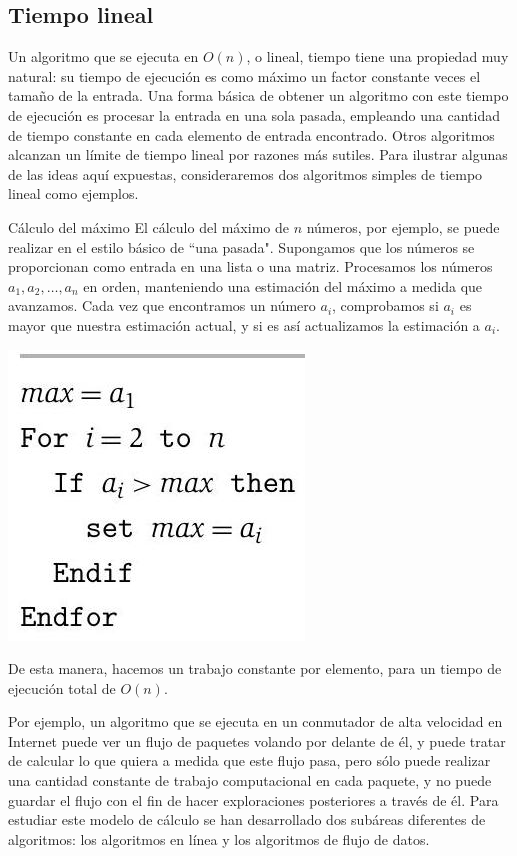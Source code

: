 \documentclass[a4paper, 12pt]{book}
\theoremstyle{dotless}
\begin{document}
\subsection*{Tiempo lineal}
Un algoritmo que se ejecuta en $O(n)$, o lineal, tiempo tiene una propiedad muy natural: su tiempo de ejecución es como máximo un factor constante veces el tamaño de la entrada. Una forma básica de obtener un algoritmo con este tiempo de ejecución es procesar la entrada en una sola pasada, empleando una cantidad de tiempo constante en cada elemento de entrada encontrado. Otros algoritmos alcanzan un límite de tiempo lineal por razones más sutiles. Para ilustrar algunas de las ideas aquí expuestas, consideraremos dos algoritmos simples de tiempo lineal como ejemplos.

Cálculo del máximo El cálculo del máximo de $n$ números, por ejemplo, se puede realizar en el estilo básico de ``una pasada". Supongamos que los números se proporcionan como entrada en una lista o una matriz. Procesamos los números $a_{1}, a_{2}, \ldots, a_{n}$ en orden, manteniendo una estimación del máximo a medida que avanzamos. Cada vez que encontramos un número $a_{i}$, comprobamos si $a_{i}$ es mayor que nuestra estimación actual, y si es así actualizamos la estimación a $a_{i}$.

\includegraphics[scale=0.3]{./Imagenes-Seccion2/2023_08_07_379b6f7f3185549667e3g-02}

De esta manera, hacemos un trabajo constante por elemento, para un tiempo de ejecución total de $O(n)$.

Por ejemplo, un algoritmo que se ejecuta en un conmutador de alta velocidad en Internet puede ver un flujo de paquetes volando por delante de él, y puede tratar de calcular lo que quiera a medida que este flujo pasa, pero sólo puede realizar una cantidad constante de trabajo computacional en cada paquete, y no puede guardar el flujo con el fin de hacer exploraciones posteriores a través de él. Para estudiar este modelo de cálculo se han desarrollado dos subáreas diferentes de algoritmos: los algoritmos en línea y los algoritmos de flujo de datos.
\end{document}

